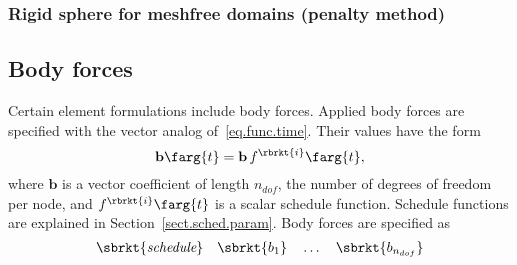 \subsubsection{Rigid sphere for meshfree domains (penalty method)}

\subsection{Body forces}
\label{set.ICandBC.body}
Certain element formulations include body forces.
Applied body forces are specified with the vector analog 
of~\eqref{eq.func.time}.
Their values have the form
\begin{equation}
\label{eq.vec.func.time}
    \mathbf{b}\farg{t} = \mathbf{b}\,f^{\rbrkt{i}}\farg{t},
\end{equation}
where $\mathbf{b}$ is a vector coefficient of length $n_{dof}$, the 
number of degrees of freedom per node, and $f^{\rbrkt{i}}\farg{t}$ 
is a scalar schedule function. Schedule functions are explained in 
Section~\ref{sect.sched.param}.
Body forces are specified as
\[  
\sbrkt{\textit{schedule}} \quad 
\sbrkt{b_{1}} \quad \ldots \quad
\sbrkt{b_{n_{dof}}}
\]

